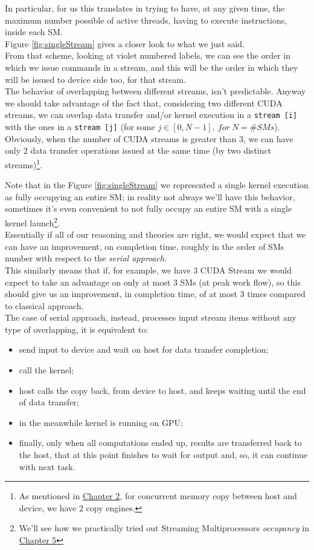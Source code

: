 	In particular, for us this translates in trying to have, at any given time, the maximum number possible of active threads, having to execute instructions, inside each SM.\\
	Figure \ref{fig:singleStream} gives a closer look to what we just said.\\
	
	From that scheme, looking at violet numbered labels, we can see the order in which we issue commands in a stream, and this will be the order in which they will be issued to device side too, for that stream. \\
	The behavior of overlapping between different streams, isn't predictable\cite{cudaguide}. Anyway we should take advantage of the fact that, considering two different CUDA streams, we can overlap data transfer and/or kernel execution in a \texttt{stream [i]} with the ones in a \texttt{stream [j]} (for some \(j\in[0,N-1], \: for \: N =\# SMs\)). Obviously, when the number of CUDA streams is greater than 3, we can have only 2 data transfer operations issued at the same time (by two distinct streams)\footnote{As mentioned in \hyperref[chap:tools]{Chapter 2}, for concurrent memory copy between host and device, we have 2 copy engines.}.
	
	Note that in the Figure \ref{fig:singleStream} we represented a single kernel execution as fully occupying an entire SM; in reality not always we'll have this behavior, sometimes it's even convenient to not fully occupy an entire SM with a single kernel launch\footnote{We'll see how we practically tried out Streaming Multiprocessors \textit{occupancy} in  \hyperref[chap:experim]{Chapter 5}}. \\
	
	Essentially if all of our reasoning and theories are right, we would expect that we can have an improvement, on completion time, roughly in the order of SMs number with respect to the \textit{serial approach}. \\
	This similarly means that if, for example, we have 3 CUDA Stream we would expect to take an advantage on only at most 3 SMs (at peak work flow), so this should give us an improvement, in completion time, of at most 3 times compared to classical approach.\\
	The case of serial approach, instead, processes input stream items without any type of overlapping, it is equivalent to:
	\begin{itemize}
		\item send input to device and wait on host for data transfer completion;
		\item call the kernel;
		\item host calls the copy back, from device to host, and keeps waiting until the end of data transfer;
		\item in the meanwhile kernel is running on GPU; 
		\item finally, only when all computations ended up, results are transferred back to the host, that at this point finishes to wait for output and, so, it can continue with next task.
	\end{itemize} 
	

